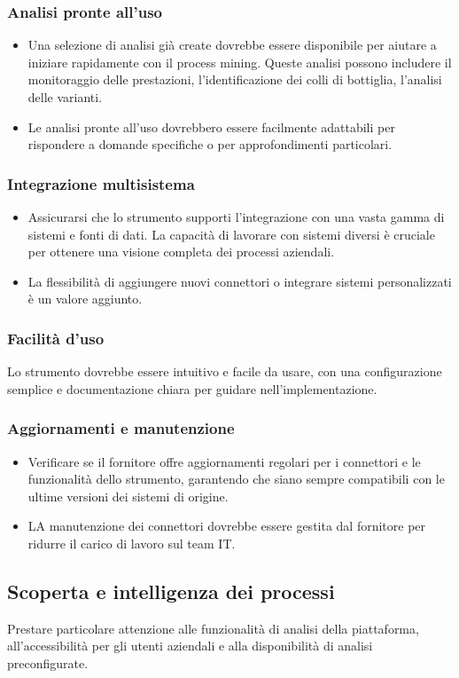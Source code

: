 \documentclass{article}
\begin{document}
\subsubsection{Analisi pronte all'uso}
\begin{itemize}
    \item Una selezione di analisi già create dovrebbe essere disponibile per aiutare a iniziare rapidamente con il process mining. Queste analisi possono includere il monitoraggio delle prestazioni, l'identificazione dei colli di bottiglia, l'analisi delle varianti.
    \item Le analisi pronte all'uso dovrebbero essere facilmente adattabili per rispondere a domande specifiche o per approfondimenti particolari.
\end{itemize}
\subsubsection{Integrazione multisistema}
\begin{itemize}
    \item Assicurarsi che lo strumento supporti l'integrazione con una vasta gamma di sistemi e fonti di dati. La capacità di lavorare con sistemi diversi è cruciale per ottenere una visione completa dei processi aziendali.
    \item La flessibilità di aggiungere nuovi connettori o integrare sistemi personalizzati è un valore aggiunto.
\end{itemize}
\subsubsection{Facilità d'uso}
Lo strumento dovrebbe essere intuitivo e facile da usare, con una configurazione semplice e documentazione chiara per guidare nell'implementazione.
\subsubsection{Aggiornamenti e manutenzione}
\begin{itemize}
    \item Verificare se il fornitore offre aggiornamenti regolari per i connettori e le funzionalità dello strumento, garantendo che siano sempre compatibili con le ultime versioni dei sistemi di origine.
    \item LA manutenzione dei connettori dovrebbe essere gestita dal fornitore per ridurre il carico di lavoro sul team IT.
\end{itemize}
\subsection{Scoperta e intelligenza dei processi}
Prestare particolare attenzione alle funzionalità di analisi della piattaforma, all'accessibilità per gli utenti aziendali e alla disponibilità di analisi preconfigurate.
\end{document}
